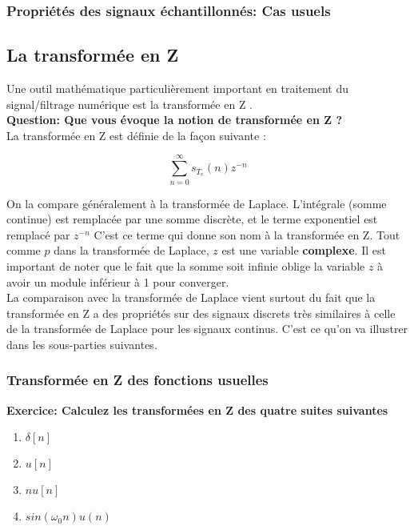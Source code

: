 \documentclass[11pt,a4paper]{article}
\begin{document}
\subsubsection{Propriétés des signaux échantillonnés: Cas usuels}

\subsection{La transformée en Z}
Une outil mathématique particulièrement important en traitement du signal/filtrage numérique est la transformée en Z .\\

\textbf{Question: Que vous évoque la notion de transformée en Z ?}\\

La transformée en Z est définie de la façon suivante :

\[\sum_{n = 0}^{\infty} s_{T_e}(n) z^{-n}\] 

On la compare généralement à la transformée de Laplace. L'intégrale (somme continue) est remplacée par une somme discrète, et le terme exponentiel est remplacé par $z^{-n}$ C'est ce terme qui donne son nom à la transformée en Z. Tout comme $p$ dans la transformée de Laplace, $z$  est une variable \textbf{complexe}. Il est important de noter que le fait que la somme soit infinie oblige la variable $z$ à avoir un module inférieur à 1 pour converger.\\

La comparaison avec la transformée de Laplace vient surtout du fait que la transformée en Z a des propriétés sur des signaux discrets très similaires à celle de la transformée de Laplace pour les signaux continus. C'est ce qu'on va illustrer dans les sous-parties suivantes.\\

\subsubsection{Transformée en Z des fonctions usuelles}

\textbf{Exercice: Calculez les transformées en Z des quatre suites suivantes}
\begin{enumerate}
\item $\delta[n]$
\item $u[n]$
\item $nu[n]$
\item $sin(\omega_0 n)u(n)$
\end{enumerate} 
\end{document}
